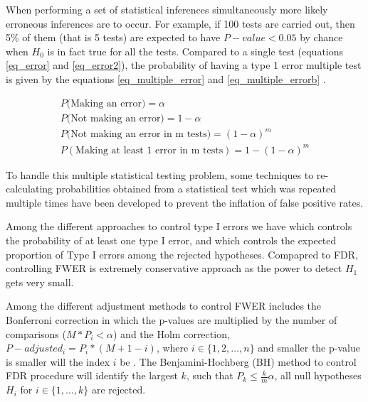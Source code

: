 When performing  a set of statistical inferences simultaneously more likely erroneous inferences are to occur.
For example, if 100 tests are carried
out, then 5\% of them (that is 5 tests) are expected to
have $P-value < 0.05$ by chance when $H_0$ is in fact true for all the tests.
Compared to a single test (equations \ref{eq_error} and \ref{eq_error2}), the probability of having a type 1 error multiple test is given by the equations \ref{eq_multiple_error} and \ref{eq_multiple_errorb} \cite{vsidak1967rectangular}.

\begin{subequations}

\begin{align}
  P(\textrm{Making an error)} = \alpha \label{eq_error}\\
  P(\textrm{Not making an error)} = 1 - \alpha \label{eq_error2}\\
  P(\textrm{Not making an error in m tests)} = (1 - \alpha)^m  \label{eq_multiple_error}\\
  P(\textrm{Making at least 1 error in m tests}) = 1 - (1 - \alpha)^m  \label{eq_multiple_errorb}
\end{align}
\end{subequations}

To handle this multiple statistical testing problem,
some techniques  to re-calculating probabilities obtained from a statistical test which was repeated multiple times
have been developed to prevent the inflation of false positive rates.


Among the different approaches to control type I errors we have
 which controls the probability of at least one type I error,
and 
which controls the expected proportion of Type I errors
among the rejected hypotheses. Compapred to FDR, controlling FWER is extremely conservative
approach as the power to detect $H_1$ gets very small.

Among the different adjustment methods to control FWER includes the Bonferroni correction
  in which the p-values are multiplied by the number of comparisons ($M * P_i < \alpha$) and the Holm correction, $P-adjusted_i = P_i * (M + 1 - i)$, where $i \in \{1,2,\dots,n\}$ and smaller the p-value is smaller will the index $i$ be \cite{aickin1996adjusting}.
 The Benjamini-Hochberg (BH) method to control FDR procedure will identify the largest $k$,
 such that $P_k \leq \frac{k}{m}\alpha$, all null hypotheses $H_i$ for $i \in \{1,\ldots,k\}$ are rejected.


